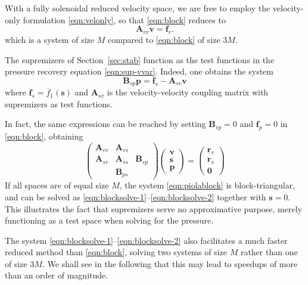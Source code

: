 \documentclass[onecolumn, twoside, a4paper, 11pt]{article}
\begin{document}
With a fully solenoidal reduced velocity space, we are free to employ the
velocity-only formulation \eqref{eqn:velonly}, so that \eqref{eqn:block} reduces
to
\begin{equation}
  \bm A_{vv} \bm v = \bm f_v.
  \label{eqn:blocksolve-1}
\end{equation}
which is a system of size $M$ compared to \eqref{eqn:block} of size $3M$.

The supremizers of Section~\ref{sec:stab} function as the test functions in the
pressure recovery equation \eqref{eqn:sup-vvar}. Indeed, one obtains the system
\begin{equation}
  \bm B_{sp} \bm p = \bm f_s - \bm A_{sv} \bm v
  \label{eqn:blocksolve-2}
\end{equation}
where $\bm f_s = \overline{f}_1(\bm s)$ and $\bm A_{sv}$ is the
velocity-velocity coupling matrix with supremizers as test functions.

In fact, the same expressions can be reached by setting $\bm B_{vp} = 0$ and
$\bm f_p = 0$ in \eqref{eqn:block}, obtaining
\begin{equation}
  \label{eqn:piolablock}
  \begin{pmatrix}
    \bm A_{vv} & \bm A_{vs} & \\
    \bm A_{sv} & \bm A_{ss} & \bm B_{sp} \\
    & \bm B_{ps} & \end{pmatrix}
  \begin{pmatrix} \bm v \\ \bm s \\ \bm p \end{pmatrix}
  = \begin{pmatrix} \bm r_v \\ \bm r_s \\ \bm 0 \end{pmatrix}
\end{equation}
If all spaces are of equal size $M$, the system \eqref{eqn:piolablock} is
block-triangular, and can be solved as
\eqref{eqn:blocksolve-1}--\eqref{eqn:blocksolve-2} together with $\bm s = 0$.
This illustrates the fact that supremizers serve no approximative purpose,
merely functioning as a test space when solving for the pressure.

The system \eqref{eqn:blocksolve-1}--\eqref{eqn:blocksolve-2} also facilitates a
much faster reduced method than \eqref{eqn:block}, solving two systems of size
$M$ rather than one of size $3M$. We shall see in the following that this may
lead to speedups of more than an order of magnitude.
\end{document}
